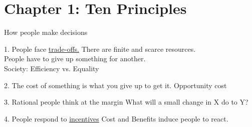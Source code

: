 \documentclass[aspectratio=169]{beamer}
\begin{document}




\section{Chapter 1: Ten Principles}

\begin{frame}{How people make decisions}
    \begin{block}{1. People face \underline{trade-offs.}}
        There are finite and scarce resources. \\
        People have to give up something for another.\\
        Society: Efficiency vs. Equality
    \end{block}

    \begin{block}{2. The cost of something is what you give up to get it.}
        Opportunity cost
    \end{block}

    \begin{block}{3. Rational people think at the margin}
        What will a small change in X do to Y?
    \end{block}

    \begin{block}{4. People respond to \underline{incentives}}
        Cost and Benefits induce people to react.
    \end{block}
\end{frame} 
\end{document}
